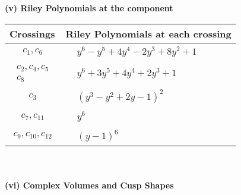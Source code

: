 \documentclass[1p]{elsarticle_modified}
\theoremstyle{definition}
\begin{document}
\newpage\renewcommand{\arraystretch}{1}
\flushleft \textbf{(v) Riley Polynomials at the component}\newline \\
\begin{tabular}{m{50pt}|m{274pt}}
Crossings & \hspace{64pt}Riley Polynomials at each crossing \\
\hline $$\begin{aligned}c_{1},c_{6}\end{aligned}$$&$\begin{aligned}
&y^6- y^5+4 y^4-2 y^3+8 y^2+1
\end{aligned}$\\
\hline $$\begin{aligned}c_{2},c_{4},c_{5}\\c_{8}\end{aligned}$$&$\begin{aligned}
&y^6+3 y^5+4 y^4+2 y^3+1
\end{aligned}$\\
\hline $$\begin{aligned}c_{3}\end{aligned}$$&$\begin{aligned}
&(y^3- y^2+2 y-1)^2
\end{aligned}$\\
\hline $$\begin{aligned}c_{7},c_{11}\end{aligned}$$&$\begin{aligned}
&y^6
\end{aligned}$\\
\hline $$\begin{aligned}c_{9},c_{10},c_{12}\end{aligned}$$&$\begin{aligned}
&(y-1)^6
\end{aligned}$\\
\hline
\end{tabular}\\~\\
\newpage\flushleft \textbf{(vi) Complex Volumes and Cusp Shapes}
\end{document}
